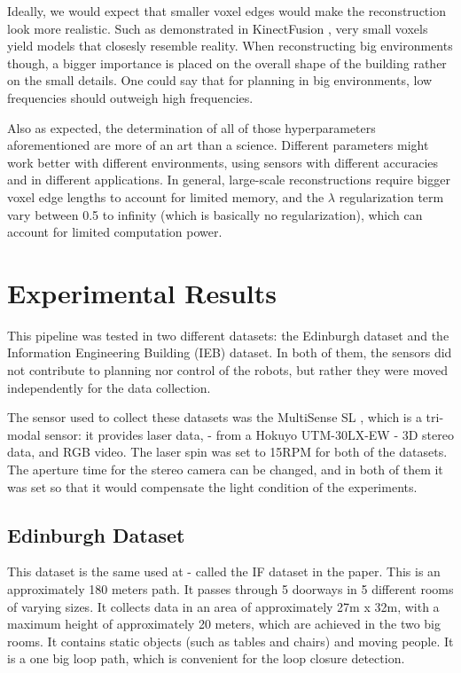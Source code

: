 \documentclass[12pt]{article}
\begin{document}
Ideally, we would expect that smaller voxel edges would make the reconstruction look more realistic. Such as demonstrated in KinectFusion \cite{kinectfusion}, very small voxels yield models that closesly resemble reality. When reconstructing big environments though, a bigger importance is placed on the overall shape of the building rather on the small details. One could say that for planning in big environments, low frequencies should outweigh high frequencies. 

Also as expected, the determination of all of those hyperparameters aforementioned are more of an art than a science. Different parameters might work better with different environments, using sensors with different accuracies and in different applications. In general, large-scale reconstructions require bigger voxel edge lengths to account for limited memory, and the $\lambda$ regularization term vary between 0.5 to infinity (which is basically no regularization), which can account for limited computation power.
			
	\newpage
	\section{Experimental Results}
	\label{subs:experiments}

This pipeline was tested in two different datasets: the Edinburgh dataset and the Information Engineering Building (IEB) dataset. In both of them, the sensors did not contribute to planning nor control of the robots, but rather they were moved independently for the data collection.
	
The sensor used to collect these datasets was the MultiSense SL \cite{multisense}, which is a tri-modal sensor: it provides laser data, - from a Hokuyo UTM-30LX-EW - 3D stereo data, and RGB video. The laser spin was set to 15RPM for both of the datasets. The aperture time for the stereo camera can be changed, and in both of them it was set so that it would compensate the light condition of the experiments. 
	
	\subsection{Edinburgh Dataset}

This dataset is the same used at \cite{AICPAlign} - called the IF dataset in the paper. This is an approximately 180 meters path. It passes through 5 doorways in 5 different rooms of varying sizes. It collects data in an area of approximately 27m x 32m, with a maximum height of approximately 20 meters, which are achieved in the two big rooms. It contains static objects (such as tables and chairs) and moving people. It is a one big loop path, which is convenient for the loop closure detection.
	
\end{document}
